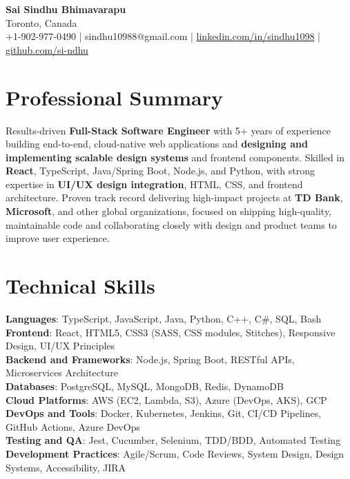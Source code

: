 

\begin{center}
  {\Large \textbf{Sai Sindhu Bhimavarapu}} \\
  Toronto, Canada \\
  +1-902-977-0490 \enspace | \enspace sindhu10988@gmail.com \enspace | \enspace \href{https://www.linkedin.com/in/sindhu1098/}{linkedin.com/in/sindhu1098} \enspace | \enspace \href{https://github.com/si-ndhu}{github.com/si-ndhu}
\end{center}

\section{Professional Summary}
  \begin{itemize}[leftmargin=0.15in, label={}]
    \small{\item{
     Results-driven \textbf{Full-Stack Software Engineer} with 5+ years of experience building end-to-end, cloud-native web applications and \textbf{designing and implementing scalable design systems} and frontend components. Skilled in \textbf{React}, TypeScript, Java/Spring Boot, Node.js, and Python, with strong expertise in \textbf{UI/UX design integration}, HTML, CSS, and frontend architecture. Proven track record delivering high-impact projects at \textbf{TD Bank}, \textbf{Microsoft}, and other global organizations, focused on shipping high-quality, maintainable code and collaborating closely with design and product teams to improve user experience.
    }}
  \end{itemize}
\vspace{-16pt}

\section{Technical Skills}
 \begin{itemize}[leftmargin=0.15in, label={}]
    \small{\item{
     \textbf{Languages}: TypeScript, JavaScript, Java, Python, C++, C\#, SQL, Bash \\
     \textbf{Frontend}: React, HTML5, CSS3 (SASS, CSS modules, Stitches), Responsive Design, UI/UX Principles \\
     \textbf{Backend and Frameworks}: Node.js, Spring Boot, RESTful APIs, Microservices Architecture \\
     \textbf{Databases}: PostgreSQL, MySQL, MongoDB, Redis, DynamoDB \\
     \textbf{Cloud Platforms}: AWS (EC2, Lambda, S3), Azure (DevOps, AKS), GCP \\
     \textbf{DevOps and Tools}: Docker, Kubernetes, Jenkins, Git, CI/CD Pipelines, GitHub Actions, Azure DevOps \\
     \textbf{Testing and QA}: Jest, Cucumber, Selenium, TDD/BDD, Automated Testing \\
     \textbf{Development Practices}: Agile/Scrum, Code Reviews, System Design, Design Systems, Accessibility, JIRA
    }}
 \end{itemize}
\vspace{-16pt}

